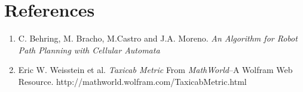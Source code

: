 \documentclass[a4paper,11pt,titlepage]{article}
\begin{document}
\section{References}
\begin{enumerate}
\item C. Behring, M. Bracho, M.Castro and J.A. Moreno.
\emph {An Algorithm for Robot Path Planning with Cellular Automata}
\item Eric W. Weisstein et al.
\emph {Taxicab Metric} From \emph{MathWorld}--A Wolfram Web Resource. http://mathworld.wolfram.com/TaxicabMetric.html
\end{enumerate}
\end{document}
